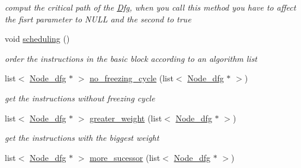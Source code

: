 \begin{DoxyCompactItemize}
\begin{DoxyCompactList}\small\item\em comput the critical path of the \hyperlink{classDfg}{Dfg}, when you call this method you have to affect the fisrt parameter to NULL and the second to true \item\end{DoxyCompactList}\item 
\hypertarget{classDfg_a9ae0a88ce5e401ff57c03f3c0aefbb2c}{
void \hyperlink{classDfg_a9ae0a88ce5e401ff57c03f3c0aefbb2c}{scheduling} ()}
\label{classDfg_a9ae0a88ce5e401ff57c03f3c0aefbb2c}

\begin{DoxyCompactList}\small\item\em order the instructions in the basic block according to an algorithm list \item\end{DoxyCompactList}\item 
\hypertarget{classDfg_ac061a080c0ce6749e7e4bdcc00e58cda}{
list$<$ \hyperlink{classNode__dfg}{Node\_\-dfg} $\ast$ $>$ \hyperlink{classDfg_ac061a080c0ce6749e7e4bdcc00e58cda}{no\_\-freezing\_\-cycle} (list$<$ \hyperlink{classNode__dfg}{Node\_\-dfg} $\ast$ $>$)}
\label{classDfg_ac061a080c0ce6749e7e4bdcc00e58cda}

\begin{DoxyCompactList}\small\item\em get the instructions without freezing cycle \item\end{DoxyCompactList}\item 
\hypertarget{classDfg_aedcfcf125b8558cb52573a6f3386b7e1}{
list$<$ \hyperlink{classNode__dfg}{Node\_\-dfg} $\ast$ $>$ \hyperlink{classDfg_aedcfcf125b8558cb52573a6f3386b7e1}{greater\_\-weight} (list$<$ \hyperlink{classNode__dfg}{Node\_\-dfg} $\ast$ $>$)}
\label{classDfg_aedcfcf125b8558cb52573a6f3386b7e1}

\begin{DoxyCompactList}\small\item\em get the instructions with the biggest weight \item\end{DoxyCompactList}\item 
\hypertarget{classDfg_a95e835dd5f2d7b54c4905a1c348906c1}{
list$<$ \hyperlink{classNode__dfg}{Node\_\-dfg} $\ast$ $>$ \hyperlink{classDfg_a95e835dd5f2d7b54c4905a1c348906c1}{more\_\-sucessor} (list$<$ \hyperlink{classNode__dfg}{Node\_\-dfg} $\ast$ $>$)}
\label{classDfg_a95e835dd5f2d7b54c4905a1c348906c1}


\end{DoxyCompactItemize}

